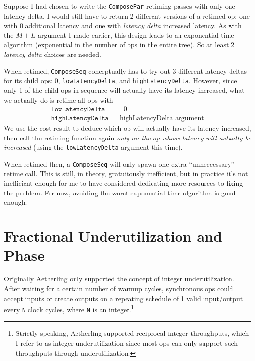 \documentclass[12pt]{article}
\begin{document}
Suppose I had chosen to write the \texttt{ComposePar} retiming passes
with only one latency delta. I would still have to return 2 different
versions of a retimed op: one with 0 additional latency and one
with \textit{latency delta} increased latency. As with the $M+L$
argument I made earlier, this design leads to an exponential time
algorithm (exponential in the number of ops in the entire tree). So
at least 2 \textit{latency delta} choices are needed.

When retimed, \texttt{ComposeSeq} conceptually has to try out 3
different latency deltas for its child ops: 0,
\texttt{lowLatencyDelta}, and \texttt{highLatencyDelta}.  However,
since only 1 of the child ops in sequence will actually have its
latency increased, what we actually do is retime all ops with
\begin{align*}
    \texttt{lowLatencyDelta} &= 0 \\
    \texttt{highLatencyDelta} &= \text{highLatencyDelta argument}
\end{align*}
We use the cost result to deduce which op will actually have its
latency increased, then call the retiming function again
\textit{only on the op whose latency will actually be increased}
(using the \texttt{lowLatencyDelta} argument this time).

When retimed then, a \texttt{ComposeSeq} will only spawn one extra
``unneccessary'' retime call. This is still, in theory, gratuitously
inefficient, but in practice it's not inefficient enough for me to
have considered dedicating more resources to fixing the problem. For
now, avoiding the worst exponential time algorithm is good enough.

\section{Fractional Underutilization and Phase}


Originally Aetherling only supported the concept of integer
underutilization. After waiting for a certain number of warmup cycles,
synchronous ops could accept inputs or create outputs on a repeating
schedule of 1 valid input/output every \texttt{N} clock cycles, where
\texttt{N} is an integer.\footnote{Strictly speaking, Aetherling
  supported reciprocal-integer throughputs, which I refer to as
  integer underutilization since most ops can only support such
  throughputs through underutilization.}
\end{document}

